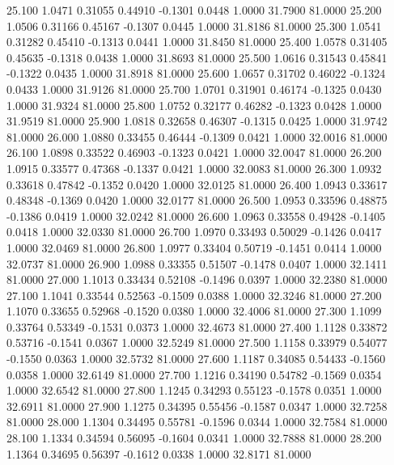   25.100   1.0471   0.31055   0.44910  -0.1301   0.0448   1.0000  31.7900  81.0000
  25.200   1.0506   0.31166   0.45167  -0.1307   0.0445   1.0000  31.8186  81.0000
  25.300   1.0541   0.31282   0.45410  -0.1313   0.0441   1.0000  31.8450  81.0000
  25.400   1.0578   0.31405   0.45635  -0.1318   0.0438   1.0000  31.8693  81.0000
  25.500   1.0616   0.31543   0.45841  -0.1322   0.0435   1.0000  31.8918  81.0000
  25.600   1.0657   0.31702   0.46022  -0.1324   0.0433   1.0000  31.9126  81.0000
  25.700   1.0701   0.31901   0.46174  -0.1325   0.0430   1.0000  31.9324  81.0000
  25.800   1.0752   0.32177   0.46282  -0.1323   0.0428   1.0000  31.9519  81.0000
  25.900   1.0818   0.32658   0.46307  -0.1315   0.0425   1.0000  31.9742  81.0000
  26.000   1.0880   0.33455   0.46444  -0.1309   0.0421   1.0000  32.0016  81.0000
  26.100   1.0898   0.33522   0.46903  -0.1323   0.0421   1.0000  32.0047  81.0000
  26.200   1.0915   0.33577   0.47368  -0.1337   0.0421   1.0000  32.0083  81.0000
  26.300   1.0932   0.33618   0.47842  -0.1352   0.0420   1.0000  32.0125  81.0000
  26.400   1.0943   0.33617   0.48348  -0.1369   0.0420   1.0000  32.0177  81.0000
  26.500   1.0953   0.33596   0.48875  -0.1386   0.0419   1.0000  32.0242  81.0000
  26.600   1.0963   0.33558   0.49428  -0.1405   0.0418   1.0000  32.0330  81.0000
  26.700   1.0970   0.33493   0.50029  -0.1426   0.0417   1.0000  32.0469  81.0000
  26.800   1.0977   0.33404   0.50719  -0.1451   0.0414   1.0000  32.0737  81.0000
  26.900   1.0988   0.33355   0.51507  -0.1478   0.0407   1.0000  32.1411  81.0000
  27.000   1.1013   0.33434   0.52108  -0.1496   0.0397   1.0000  32.2380  81.0000
  27.100   1.1041   0.33544   0.52563  -0.1509   0.0388   1.0000  32.3246  81.0000
  27.200   1.1070   0.33655   0.52968  -0.1520   0.0380   1.0000  32.4006  81.0000
  27.300   1.1099   0.33764   0.53349  -0.1531   0.0373   1.0000  32.4673  81.0000
  27.400   1.1128   0.33872   0.53716  -0.1541   0.0367   1.0000  32.5249  81.0000
  27.500   1.1158   0.33979   0.54077  -0.1550   0.0363   1.0000  32.5732  81.0000
  27.600   1.1187   0.34085   0.54433  -0.1560   0.0358   1.0000  32.6149  81.0000
  27.700   1.1216   0.34190   0.54782  -0.1569   0.0354   1.0000  32.6542  81.0000
  27.800   1.1245   0.34293   0.55123  -0.1578   0.0351   1.0000  32.6911  81.0000
  27.900   1.1275   0.34395   0.55456  -0.1587   0.0347   1.0000  32.7258  81.0000
  28.000   1.1304   0.34495   0.55781  -0.1596   0.0344   1.0000  32.7584  81.0000
  28.100   1.1334   0.34594   0.56095  -0.1604   0.0341   1.0000  32.7888  81.0000
  28.200   1.1364   0.34695   0.56397  -0.1612   0.0338   1.0000  32.8171  81.0000
